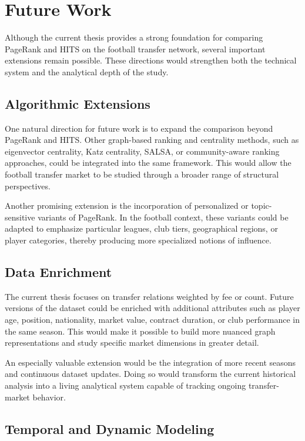 \chapter{Future Work}
\label{ch:future_work}

Although the current thesis provides a strong foundation for comparing PageRank and HITS on the football transfer network, several important extensions remain possible. These directions would strengthen both the technical system and the analytical depth of the study.

\section{Algorithmic Extensions}
\label{sec:future_algorithms}

One natural direction for future work is to expand the comparison beyond PageRank and HITS. Other graph-based ranking and centrality methods, such as eigenvector centrality, Katz centrality, SALSA, or community-aware ranking approaches, could be integrated into the same framework. This would allow the football transfer market to be studied through a broader range of structural perspectives.

Another promising extension is the incorporation of personalized or topic-sensitive variants of PageRank. In the football context, these variants could be adapted to emphasize particular leagues, club tiers, geographical regions, or player categories, thereby producing more specialized notions of influence.

\section{Data Enrichment}
\label{sec:future_data}

The current thesis focuses on transfer relations weighted by fee or count. Future versions of the dataset could be enriched with additional attributes such as player age, position, nationality, market value, contract duration, or club performance in the same season. This would make it possible to build more nuanced graph representations and study specific market dimensions in greater detail.

An especially valuable extension would be the integration of more recent seasons and continuous dataset updates. Doing so would transform the current historical analysis into a living analytical system capable of tracking ongoing transfer-market behavior.

\section{Temporal and Dynamic Modeling}
\label{sec:future_temporal}

